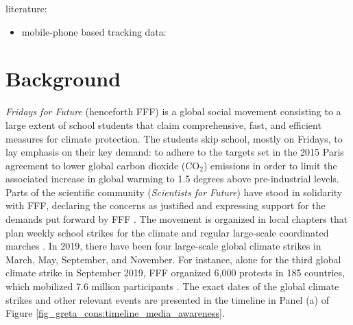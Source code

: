 literature: 
\begin{itemize}
	\item mobile-phone based tracking data: \cite{dave2020contagion}
\end{itemize}



\newpage
\section{Background}\label{sec_greta_cons:background}

\textit{Fridays for Future} (henceforth FFF) is a global social movement consisting to a large extent of school students that claim comprehensive, fast, and efficient measures for climate protection. The students skip school, mostly on Fridays, to lay emphasis on their key demand: to adhere to the targets set in the 2015 Paris agreement to lower global carbon dioxide (CO$_2$) emissions in order to limit the associated increase in global warming to 1.5 degrees above pre-industrial levels. Parts of the scientific community (\textit{Scientists for Future}) have stood in solidarity with FFF, declaring the concerns as justified and expressing support for the demands put forward by FFF \citep{warren2019thousands,hagedorn2019science}. The movement is organized in local chapters that plan weekly school strikes for the climate and regular large-scale coordinated marches \citep{smith2019window}. In 2019, there have been four large-scale global climate strikes in March, May, September, and November. For instance, alone for the third global climate strike in September 2019, FFF organized 6,000 protests in 185 countries, which mobilized 7.6 million participants \citep{demoor2020protest}. The exact dates of the global climate strikes and other relevant events are presented in the timeline in Panel (a) of Figure \ref{fig_greta_cons:timeline_media_awareness}.


